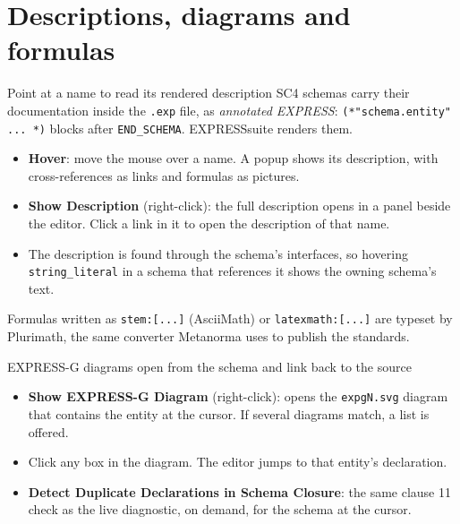 \documentclass[11pt]{beamer}
\newcommand{\code}[1]{\texttt{#1}}
\begin{document}
\section{Descriptions, diagrams and formulas}

\begin{frame}{Point at a name to read its rendered description}
  SC4 schemas carry their documentation inside the \code{.exp} file, as
  \emph{annotated EXPRESS}: \code{(*"schema.entity" ... *)} blocks after
  \code{END\_SCHEMA}. EXPRESSsuite renders them.
  \begin{itemize}
    \item \textbf{Hover}: move the mouse over a name. A popup shows its description,
      with cross-references as links and formulas as pictures.
    \item \textbf{Show Description} (right-click): the full description opens in a panel
      beside the editor. Click a link in it to open the description of that name.
    \item The description is found through the schema's interfaces, so hovering
      \code{string\_literal} in a schema that references it shows the owning
      schema's text.
  \end{itemize}
  \medskip
  \footnotesize\color{sc4grey}
  Formulas written as \code{stem:[...]} (AsciiMath) or \code{latexmath:[...]} are typeset
  by Plurimath, the same converter Metanorma uses to publish the standards.
\end{frame}

\begin{frame}{EXPRESS-G diagrams open from the schema and link back to the source}
  \begin{itemize}
    \item \textbf{Show EXPRESS-G Diagram} (right-click): opens the \code{expgN.svg}
      diagram that contains the entity at the cursor. If several diagrams match, a list is offered.
    \item Click any box in the diagram. The editor jumps to that entity's declaration.
    \item \textbf{Detect Duplicate Declarations in Schema Closure}: the same clause 11
      check as the live diagnostic, on demand, for the schema at the cursor.
  \end{itemize}
\end{frame}
\end{document}

